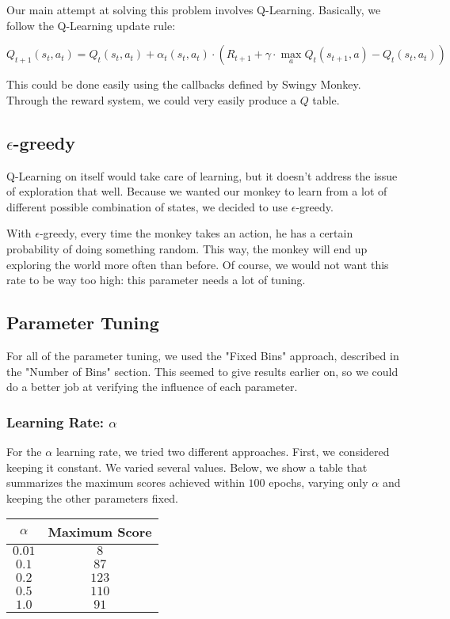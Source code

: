 \documentclass[10pt]{article}
\begin{document}
Our main attempt at solving this problem involves Q-Learning. Basically, we
follow the Q-Learning update rule:

\[ Q_{t+1}(s_t, a_t) = Q_{t}(s_t, a_t) + \alpha_t(s_t, a_t) \cdot \left( R_{t+1} + \gamma \cdot \max_a Q_t(s_{t+1}, a) - Q_t(s_t, a_t) \right) \]

\medskip

This could be done easily using the callbacks defined by Swingy Monkey. Through
the reward system, we could very easily produce a $Q$ table.

\subsection{$\epsilon$-greedy}

Q-Learning on itself would take care of learning, but it doesn't address the
issue of exploration that well. Because we wanted our monkey to learn from
a lot of different possible combination of states, we decided to use $\epsilon$-greedy. 

\medskip

With $\epsilon$-greedy, every time the monkey takes an action, he has a certain
probability of doing something random. This way, the monkey will end up exploring
the world more often than before. Of course, we would not want this rate to
be way too high: this parameter needs a lot of tuning.

\subsection{Parameter Tuning}

For all of the parameter tuning, we used the "Fixed Bins" approach, described
in the "Number of Bins" section. This seemed to give results earlier on, so we
could do a better job at verifying the influence of each parameter.

\subsubsection{Learning Rate: $\alpha$}

For the $\alpha$ learning rate, we tried two different approaches. First, we 
considered keeping it constant. We varied several values. Below, we show a table
that summarizes the maximum scores achieved within $100$ epochs, varying only
$\alpha$ and keeping the other parameters fixed.

\medskip

\begin{center} 
\begin{tabular}{c|c} 
\hline
$\alpha$ & Maximum Score \\ \hline
$0.01$ & $8$ \\ \hline
$0.1$  & $87$ \\ \hline 
$0.2$ & $123$ \\ \hline 
$0.5$ & $110$ \\ \hline 
$1.0$ & $91$ \\ \hline 
\end{tabular} 
\end{center}
\end{document}
